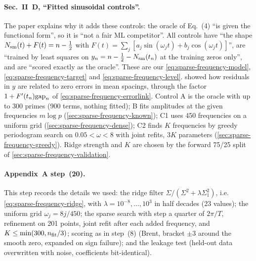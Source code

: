 \paragraph{Sec.~II~D, ``Fitted sinusoidal controls''.} The paper explains why it adds these controls: the oracle of Eq.~(4) ``is given the functional form'', so it is ``not a fair ML competitor''. All controls have ``the shape $N_{\mathrm{sm}}(t)+F(t)=n-\tfrac12$ with $F(t)=\sum_j[a_j\sin(\omega_jt)+b_j\cos(\omega_jt)]$'', are ``trained by least squares on $y_n=n-\tfrac12-N_{\mathrm{sm}}(t_n)$ at the training zeros only'', and are ``scored exactly as the oracle''. These are our \eqref{eq:sparse-frequency-model}, \eqref{eq:sparse-frequency-target} and \eqref{eq:sparse-frequency-level}.  showed how residuals in $y$ are related to zero errors in mean spacings, through the factor $1+F'(t_n)\mathrm{gap}_n$ of \eqref{eq:sparse-frequency-errorlink}. Control A is the oracle with up to 300 primes (900 terms, nothing fitted); B fits amplitudes at the given frequencies $m\log p$ (\cref{sec:sparse-frequency-known}); C1 uses 450 frequencies on a uniform grid (\cref{sec:sparse-frequency-dense}); C2 finds $K$ frequencies by greedy periodogram search on $0.05<\omega<8$ with joint refits, $3K$ parameters (\cref{sec:sparse-frequency-greedy}). Ridge strength and $K$ are chosen by the forward 75/25 split of \cref{sec:sparse-frequency-validation}.

\paragraph{Appendix~A step~(20).} This step records the details we used: the ridge filter $\Sigma/(\Sigma^2+\lambda\Sigma_1^2)$, i.e. \eqref{eq:sparse-frequency-ridge}, with $\lambda=10^{-8},\dots,10^3$ in half decades (23 values); the uniform grid $\omega_j=8j/450$; the sparse search with step a quarter of $2\pi/T$, refinement on 201 points, joint refit after each added frequency, and $K\le\min(300,n_{\rm fit}/3)$; scoring as in step~(8) (Brent, bracket $\pm3$ around the smooth zero, expanded on sign failure); and the leakage test (held-out data overwritten with noise, coefficients bit-identical).

